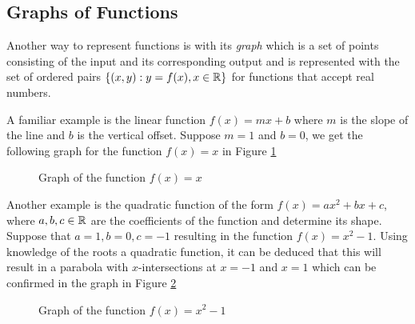 \subsection{Graphs of Functions}

Another way to represent functions is with its \textit{graph} which is a set of points consisting of the input and its corresponding output and is represented with the set of ordered pairs $\{(x,y) : y = f(x), x\in\mathbb{R}\}$ for functions that accept real numbers.

\begin{example}
    A familiar example is the linear function $f(x) = mx + b$ where $m$ is the slope of the line and $b$ is the vertical offset. Suppose $m = 1$ and $b = 0$, we get the following graph for the function $f(x) = x$ in Figure \ref{f(x)=x graph}
    \begin{figure}[!ht]
        \centering
        \label{f(x)=x graph}
        \caption{Graph of the function $f(x) = x$}
    \end{figure}
\end{example}

\begin{example}
    Another example is the quadratic function of the form $f(x) = ax^2 + bx + c$, where $a,b,c \in \mathbb{R}$ are the coefficients of the function and determine its shape. Suppose that $a = 1, b = 0, c = -1$ resulting in the function $f(x) = x^2 - 1$. Using knowledge of the roots a quadratic function, it can be deduced that this will result in a parabola with $x$-intersections at $x = -1$ and $x = 1$ which can be confirmed in the graph in Figure \ref{f(x)=x^2-1graph}

    \begin{figure}[!ht]
        \centering
        \label{f(x)=x^2-1graph}
        \caption{Graph of the function $f(x) = x^2-1$}
    \end{figure}
\end{example}


